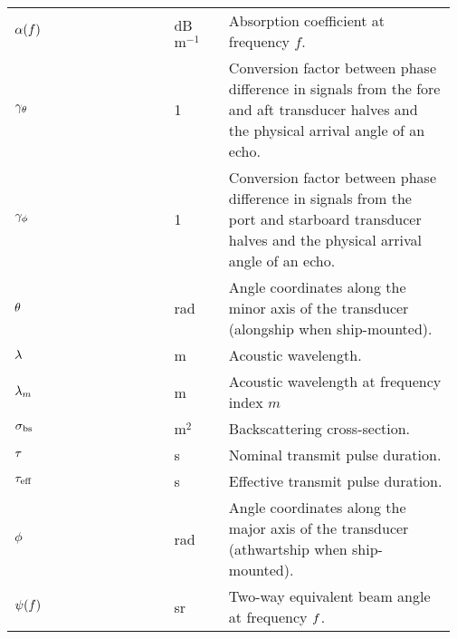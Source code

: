 \documentclass[12pt,a4paper]{article}
\begin{document}
\begin{longtable}{p{0.15\linewidth} p{0.20\linewidth} p{0.12\linewidth} p{0.5\linewidth} }
$\alpha(f)$  & & dB $\textrm{m}^{-1}$ & Absorption coefficient at frequency $f$.\\
$\gamma_\theta$ & & 1 & Conversion factor between phase difference in signals from the fore and aft transducer halves and the physical arrival angle of an echo.\\
$\gamma_\phi$ & & 1 & Conversion factor between phase difference in signals from the port and starboard transducer halves and the physical arrival angle of an echo.\\
$\theta$ & & rad & Angle coordinates along the minor axis of the transducer (alongship when ship-mounted).\\
$\lambda$ & & m &  Acoustic wavelength.\\
$\lambda_m$ & & m & Acoustic wavelength at frequency index $m$\\
$\sigma_{\textrm{bs}}$ & & $\textrm{m}^2$ & Backscattering cross-section.\\
$\tau$ & & s & Nominal transmit pulse duration.\\
$\tau_{\textrm{eff}}$ & & s & Effective transmit pulse duration.\\
$\phi$ & & rad & Angle coordinates along the major axis of the transducer (athwartship when ship-mounted).\\
$\psi(f)$ & & sr & Two-way equivalent beam angle at frequency $f$.\\
\end{longtable}
\end{document}
